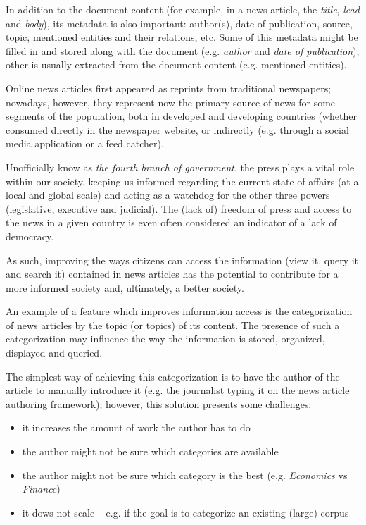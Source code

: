 \documentclass[conference]{IEEEtran}
\begin{document}
In addition to the document content (for example, in a news article,
the \emph{title}, \emph{lead} and \emph{body}), its metadata is also
important: author(s), date of publication, source, topic, mentioned
entities and their relations, etc. Some of this metadata might be
filled in and stored along with the document (e.g. \emph{author} and
\emph{date of publication}); other is usually extracted from the
document content (e.g. mentioned entities).

Online news articles first appeared as reprints from traditional
newspapers; nowadays, however, they represent now the primary source
of news for some segments of the population, both in developed and
developing countries (whether consumed directly in the newspaper
website, or indirectly (e.g. through a social media application or a
feed catcher).

Unofficially know as \emph{the fourth branch of government}, the press
plays a vital role within our society, keeping us informed regarding
the current state of affairs (at a local and global scale) and acting
as a watchdog for the other three powers (legislative, executive and
judicial). The (lack of) freedom of press and access to the news in a
given country is even often considered an indicator of a lack of
democracy\cite{goode2009social}.

As such, improving the ways citizens can access the information (view
it, query it and search it) contained in news articles has the
potential to contribute for a more informed society and, ultimately, a
better society.

An example of a feature which improves information access is the
categorization of news articles by the topic (or topics) of its
content. The presence of such a categorization may influence the way
the information is stored, organized, displayed and queried.

The simplest way of achieving this categorization is to have the
author of the article to manually introduce it (e.g. the journalist
typing it on the news article authoring framework); however, this
solution presents some challenges:
\begin{itemize}
    \item it increases the amount of work the author has to do
    \item the author might not be sure which categories are available
    \item the author might not be sure which category is the best
        (e.g. \emph{Economics} vs  \emph{Finance})
    \item it dows not scale -- e.g. if the goal is to categorize an
        existing (large) corpus
\end{itemize}
\end{document}
